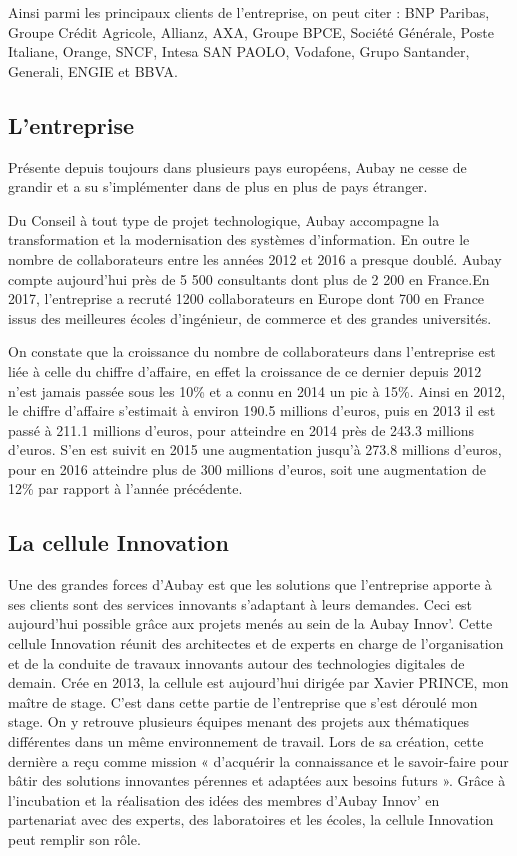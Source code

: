 \documentclass[12pt,a4paper]{article}
\begin{document}
Ainsi parmi les principaux clients de l’entreprise, on peut citer : BNP Paribas, Groupe Crédit Agricole, Allianz, AXA, Groupe BPCE, Société Générale, Poste Italiane, Orange, SNCF, Intesa SAN PAOLO, Vodafone, Grupo Santander, Generali, ENGIE et BBVA.

\subsection{L'entreprise}
Présente depuis toujours dans plusieurs pays européens, Aubay ne cesse de grandir et a su s'implémenter dans de plus en plus de pays étranger.


Du Conseil à tout type de projet technologique, Aubay accompagne la transformation et la modernisation des systèmes d’information.\bigbreak
En outre le nombre de collaborateurs entre les années 2012 et 2016 a presque doublé. Aubay compte aujourd’hui près de 5 500 consultants dont plus de 2 200 en France.En 2017, l’entreprise a recruté 1200 collaborateurs en Europe dont 700 en France issus des meilleures écoles d’ingénieur, de commerce et des grandes universités.


\newpage
On constate que la croissance du nombre de collaborateurs dans l’entreprise est liée à celle du chiffre d’affaire, en effet la croissance de ce dernier depuis 2012 n’est jamais passée sous les 10\% et a connu en 2014 un pic à 15\%. Ainsi en 2012, le chiffre d’affaire s'estimait à environ 190.5 millions d’euros, puis en 2013 il est passé à 211.1 millions d’euros, pour atteindre en 2014 près de 243.3 millions d’euros. S’en est suivit en 2015 une augmentation jusqu’à 273.8 millions d’euros, pour en 2016 atteindre plus de 300 millions d’euros, soit une augmentation de 12\% par rapport à l’année précédente.


\subsection{La cellule Innovation}

Une des grandes forces d’Aubay est que les solutions que l’entreprise apporte à ses clients sont des services innovants s’adaptant à leurs demandes. Ceci est aujourd’hui possible grâce aux projets menés au sein de la Aubay Innov’.\bigbreak
Cette cellule Innovation réunit des architectes et de experts en charge de l’organisation et de la conduite de travaux innovants autour des technologies digitales de demain. Crée en 2013, la cellule est aujourd’hui dirigée par Xavier PRINCE, mon maître de stage. C’est dans cette partie de l’entreprise que s’est déroulé mon stage. On y retrouve plusieurs équipes menant des projets aux thématiques différentes dans un même environnement de travail.\bigbreak
Lors de sa création, cette dernière a reçu comme mission « d’acquérir la connaissance et le savoir-faire pour bâtir des solutions innovantes pérennes et adaptées aux besoins futurs ».  Grâce à l’incubation et la réalisation des idées des membres d’Aubay Innov’ en partenariat avec des experts, des laboratoires et les écoles, la cellule Innovation peut remplir son rôle.\bigbreak
\end{document}
